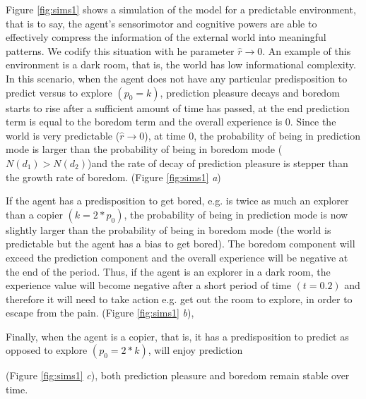 \documentclass[11pt, onecolumn]{article}
\begin{document}
Figure \ref{fig:sims1} shows a simulation of the model for a predictable environment, that is to say, the agent's sensorimotor and cognitive powers are able to effectively compress the information of the external world into meaningful patterns. We codify this situation with he parameter $\hat{r} \to 0$. An example of this environment is a dark room, that is, the world has low informational complexity.
In this scenario, when the agent does not have any particular predisposition to predict versus to explore $(p_0 = k)$, prediction pleasure decays and boredom starts to rise after a sufficient amount of time has passed, at the end prediction term is equal to the boredom term and the overall experience is 0. Since the world is very predictable ($\hat{r} \to 0$), at time 0, the probability of being in prediction mode is larger than the probability of being in boredom mode ($N(d_1) > N(d_2)$)and the rate of decay of prediction pleasure is stepper than the growth rate of boredom. (Figure \ref{fig:sims1} \emph{a}) %

If the agent has a predisposition to get bored, e.g. is twice as much an explorer than a copier $(k = 2*p_0)$, the probability of being in prediction mode is now slightly larger than the probability of being in boredom mode (the world is predictable but the agent has a bias to get bored). The boredom component will exceed the prediction component and the overall experience will be negative at the end of the period. Thus, if the agent is an explorer in a dark room, the experience value will become negative after a short period of time $(t = 0.2)$ and therefore it will need to take action e.g. get out the room to explore, in order to escape from the pain. (Figure \ref{fig:sims1} \emph{b}), %

Finally, when the agent is a copier, that is, it has a predisposition to predict as opposed to explore $(p_0 = 2*k)$, will enjoy prediction 




(Figure \ref{fig:sims1} \emph{c}), both prediction pleasure and boredom remain stable over time. 
\end{document}
